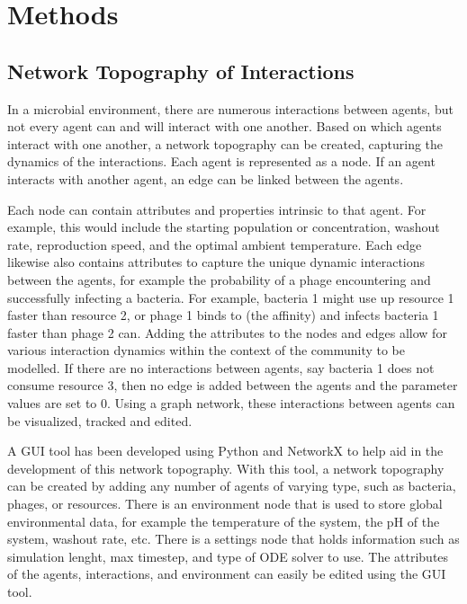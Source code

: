 \chapter{Methods}
\label{Methods}

\section{Network Topography of Interactions}
In a microbial environment, there are numerous interactions between agents, but not every agent can and will interact with one another.
Based on which agents interact with one another, a network topography can be created, capturing the dynamics of the interactions.
Each agent is represented as a node.
If an agent interacts with another agent, an edge can be linked between the agents.

Each node can contain attributes and properties intrinsic to that agent. 
For example, this would include the starting population or concentration, washout rate, reproduction speed, and the optimal ambient temperature. 
Each edge likewise also contains attributes to capture the unique dynamic interactions between the agents, for example the probability of a phage encountering and successfully infecting a bacteria. 
For example, bacteria 1 might use up resource 1 faster than resource 2, or phage 1 binds to (the affinity) and infects bacteria 1 faster than phage 2 can. 
Adding the attributes to the nodes and edges allow for various interaction dynamics within the context of the community to be modelled. 
If there are no interactions between agents, say bacteria 1 does not consume resource 3, then no edge is added between the agents and the parameter values are set to 0. 
Using a graph network, these interactions between agents can be visualized, tracked and edited. \newline 

A GUI tool has been developed using Python and NetworkX to help aid in the development of this network topography. 
With this tool, a network topography can be created by adding any number of agents of varying type, such as bacteria, phages, or resources.
There is an environment node that is used to store global environmental data, for example the temperature of the system, the pH of the system, washout rate, etc.
There is a settings node that holds information such as simulation lenght, max timestep, and type of ODE solver to use. 
The attributes of the agents, interactions, and environment can easily be edited using the GUI tool. \newline 

